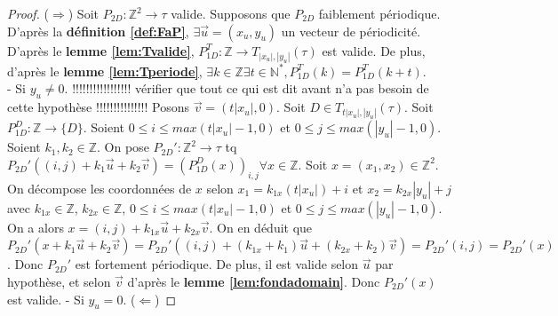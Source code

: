 \documentclass[a4paper,10pt,oneside]{article} %
\begin{document}
\begin{proof}
    ($\Rightarrow$) Soit $P_{2D} : \mathds{Z}^2 \rightarrow \tau$ valide. Supposons que $P_{2D}$ faiblement périodique. D'après la \textbf{définition \ref{def:FaP}}, $\exists \Vec{u} = (x_u, y_u)$ un vecteur de périodicité. D'après le  \textbf{lemme \ref{lem:Tvalide}}, $P_{1D}^T : \mathds{Z} \rightarrow T_{|x_u|, |y_u|}(\tau)$ est valide. De plus, d'après le \textbf{lemme \ref{lem:Tperiode}}, $\exists k \in \mathds{Z} \exists t \in \mathds{N}^*, P_{1D}^T(k) = P_{1D}^T(k+t)$.\\
    - Si $y_u \neq 0$. !!!!!!!!!!!!!!!!! vérifier que tout ce qui est dit avant n'a pas besoin de cette hypothèse !!!!!!!!!!!!!!! Posons $\Vec{v} = (t|x_u|,0)$. Soit $D \in T_{t|x_u|, |y_u|}(\tau)$. Soit $P_{1D}^D : \mathds{Z} \rightarrow \{D\}$. Soient $0 \leq i \leq max(t|x_u| - 1,0)$ et $0 \leq j \leq max(|y_u|-1, 0)$. Soient $k_1, k_2 \in \mathds{Z}$. On pose $P_{2D}' : \mathds{Z}^2 \rightarrow \tau$ tq $P_{2D}'((i,j)+k_1\Vec{u}+k_2\Vec{v}) = (P_{1D}^D(x))_{i,j} \forall x \in \mathds{Z}$. Soit $x = (x_1, x_2) \in \mathds{Z}^2$. On décompose les coordonnées de $x$ selon $x_1 = k_{1x}(t|x_u|)+i$ et $x_2 = k_{2x}|y_u|+j$ avec $k_{1x} \in \mathds{Z}$, $k_{2x} \in \mathds{Z}$, $0 \leq i \leq max(t|x_u| - 1,0)$ et $0 \leq j \leq max(|y_u|-1, 0)$. On a alors $x=(i,j)+k_{1x}\Vec{u}+k_{2x}\Vec{v}$. On en déduit que $P_{2D}'(x+k_1\Vec{u}+k_2\Vec{v}) = P_{2D}'((i,j)+(k_{1x}+k_1)\Vec{u}+(k_{2x} + k_2)\Vec{v}) = P_{2D}'(i,j) = P_{2D}'(x)$. Donc $P_{2D}'$ est fortement périodique. De plus, il est valide selon $\Vec{u}$ par hypothèse, et selon $\Vec{v}$ d'après le \textbf{lemme \ref{lem:fondadomain}}. Donc $P_{2D}'(x)$ est valide.
    - Si $y_u = 0$.
    \newline
    ($\Leftarrow$) 
\end{proof}
    
\end{document}

